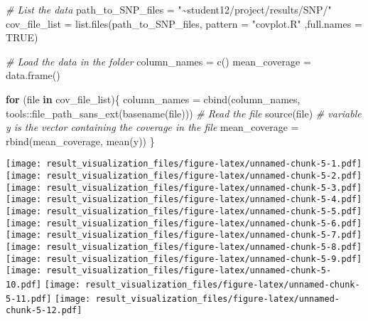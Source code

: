 \documentclass[
]{article}
\newenvironment{Shaded}{\begin{snugshade}}{\end{snugshade}}
\newcommand{\AttributeTok}[1]{\textcolor[rgb]{0.77,0.63,0.00}{#1}}
\newcommand{\CommentTok}[1]{\textcolor[rgb]{0.56,0.35,0.01}{\textit{#1}}}
\newcommand{\ConstantTok}[1]{\textcolor[rgb]{0.00,0.00,0.00}{#1}}
\newcommand{\ControlFlowTok}[1]{\textcolor[rgb]{0.13,0.29,0.53}{\textbf{#1}}}
\newcommand{\FunctionTok}[1]{\textcolor[rgb]{0.00,0.00,0.00}{#1}}
\newcommand{\NormalTok}[1]{#1}
\newcommand{\OtherTok}[1]{\textcolor[rgb]{0.56,0.35,0.01}{#1}}
\newcommand{\SpecialCharTok}[1]{\textcolor[rgb]{0.00,0.00,0.00}{#1}}
\newcommand{\StringTok}[1]{\textcolor[rgb]{0.31,0.60,0.02}{#1}}
\begin{document}
\begin{Shaded}
\begin{Highlighting}[]
\CommentTok{\# List the data}
\NormalTok{path\_to\_SNP\_files }\OtherTok{=} \StringTok{"\textasciitilde{}student12/project/results/SNP/"}
\NormalTok{cov\_file\_list }\OtherTok{=} \FunctionTok{list.files}\NormalTok{(path\_to\_SNP\_files, }\AttributeTok{pattern =} \StringTok{"covplot.R"}\NormalTok{ ,}\AttributeTok{full.names =} \ConstantTok{TRUE}\NormalTok{)}

\CommentTok{\# Load the data in the folder}
\NormalTok{column\_names }\OtherTok{=} \FunctionTok{c}\NormalTok{()}
\NormalTok{mean\_coverage }\OtherTok{=} \FunctionTok{data.frame}\NormalTok{()}

\ControlFlowTok{for}\NormalTok{ (file }\ControlFlowTok{in}\NormalTok{ cov\_file\_list)\{}
\NormalTok{  column\_names }\OtherTok{=} \FunctionTok{cbind}\NormalTok{(column\_names, tools}\SpecialCharTok{::}\FunctionTok{file\_path\_sans\_ext}\NormalTok{(}\FunctionTok{basename}\NormalTok{(file)))}
  \CommentTok{\# Read the file}
  \FunctionTok{source}\NormalTok{(file)}
  \CommentTok{\# variable y is the vector containing the coverage in the file}
\NormalTok{  mean\_coverage }\OtherTok{=} \FunctionTok{rbind}\NormalTok{(mean\_coverage, }\FunctionTok{mean}\NormalTok{(y))}
\NormalTok{\}}
\end{Highlighting}
\end{Shaded}

\texttt{[image: result\_visualization\_files/figure-latex/unnamed-chunk-5-1.pdf]}
\texttt{[image: result\_visualization\_files/figure-latex/unnamed-chunk-5-2.pdf]}
\texttt{[image: result\_visualization\_files/figure-latex/unnamed-chunk-5-3.pdf]}
\texttt{[image: result\_visualization\_files/figure-latex/unnamed-chunk-5-4.pdf]}
\texttt{[image: result\_visualization\_files/figure-latex/unnamed-chunk-5-5.pdf]}
\texttt{[image: result\_visualization\_files/figure-latex/unnamed-chunk-5-6.pdf]}
\texttt{[image: result\_visualization\_files/figure-latex/unnamed-chunk-5-7.pdf]}
\texttt{[image: result\_visualization\_files/figure-latex/unnamed-chunk-5-8.pdf]}
\texttt{[image: result\_visualization\_files/figure-latex/unnamed-chunk-5-9.pdf]}
\texttt{[image: result\_visualization\_files/figure-latex/unnamed-chunk-5-10.pdf]}
\texttt{[image: result\_visualization\_files/figure-latex/unnamed-chunk-5-11.pdf]}
\texttt{[image: result\_visualization\_files/figure-latex/unnamed-chunk-5-12.pdf]}
\end{document}
